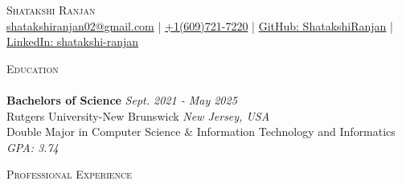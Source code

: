 \documentclass[a4paper]{article}
\newcommand{\lineunder} {
    \vspace*{-8pt} \\
    \hspace*{-18pt} \hrulefill \\
}
\newcommand{\header} [1] {
    {\hspace*{-18pt}\vspace*{6pt} \textsc{#1}}
    \vspace*{-6pt} \lineunder
}
\begin{document}
\vspace*{-35pt}

\begin{center}
{\Large \scshape Shatakshi Ranjan}\\
\vspace{2pt}
\small{ \href{mailto:shatakshiranjan02@gmail.com}{shatakshiranjan02@gmail.com}  | \href{tel:6097217220}{+1(609)721-7220} | \href{https://github.com/ShatakshiRanjan}{GitHub: ShatakshiRanjan}  | \href{https://www.linkedin.com/in/shatakshi-ranjan/}{LinkedIn: shatakshi-ranjan}}\\
\end{center}
\vspace{-4pt} 

%
%
\header{Education}
\textbf{Bachelors of Science}  \hfill \textit{Sept. 2021 - May 2025}\\
{\small
Rutgers University-New Brunswick \hfill \textit{New Jersey, USA}\\
Double Major in Computer Science \& Information Technology and Informatics
{\hfill \textit{GPA: 3.74}}\\
}
\vspace{0.5mm} 

%
%
\header{Professional Experience}
\end{document}
